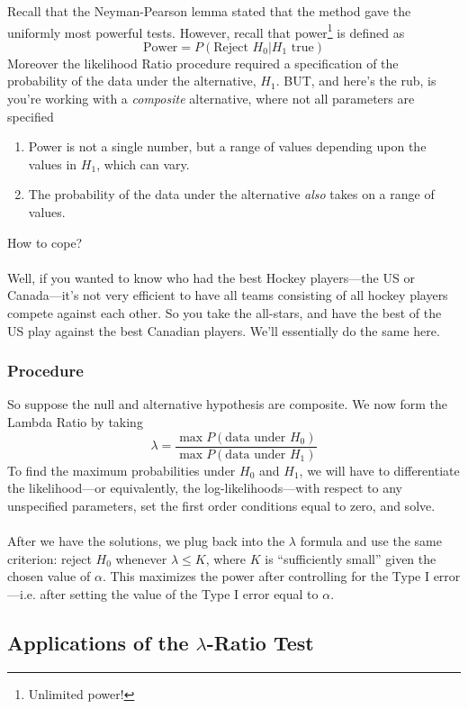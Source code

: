\documentclass[a4paper,12pt]{scrartcl}
\begin{document}
Recall that the Neyman-Pearson lemma stated that the method gave
the uniformly most powerful tests. However, recall that power\footnote{
Unlimited power!} is defined as
   \[ \text{Power} = P(\text{Reject $H_0$} | \text{$H_1$ true}) \]
Moreover the likelihood Ratio procedure required a specification 
of the probability of the data under the alternative, $H_1$. BUT,
and here's the rub, is you're working with a \emph{composite} 
alternative, where not all parameters are specified
\begin{enumerate}
   \item Power is not a single number, but a range of values 
      depending upon the values in $H_1$, which can vary.
   \item The probability of the data under the alternative \emph{also}
      takes on a range of values.
\end{enumerate}
How to cope?
\\
\\
Well, if you wanted to know who had the best Hockey players---the US
or Canada---it's not very efficient to have all teams consisting of 
all hockey players compete against each other. So you take the 
all-stars, and have the best of the US play against the best Canadian
players.  We'll essentially do the same here.

\subsubsection{Procedure}

So suppose the null and alternative hypothesis are composite. 
We now form the Lambda Ratio by taking
\[ \lambda =    
   \frac{\max P(\text{data under $H_0$})}{
      \max P(\text{data under $H_1$})}
   \]
To find the maximum probabilities under $H_0$ and $H_1$, we
will have to differentiate the likelihood---or equivalently, the
log-likelihoods---with respect to any unspecified parameters, set
the first order conditions equal to zero, and solve. 
\\
\\
After we have the solutions, we plug back into the $\lambda$ formula 
and use the same criterion:
reject $H_0$ whenever $\lambda\leq K$,
where $K$ is ``sufficiently small'' given the chosen value of $\alpha$.
This maximizes the power after controlling for the Type I error---i.e.
after setting the value of the Type I error equal to $\alpha$.


\newpage
\subsection{Applications of the $\lambda$-Ratio Test}
\end{document}
